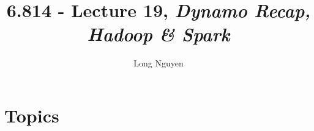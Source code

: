 \documentclass{article}
\title{6.814 - Lecture 19, \emph{Dynamo Recap, Hadoop \& Spark}}
\author{Long Nguyen}
\begin{document}
\maketitle

\section{Topics}
\end{document}
